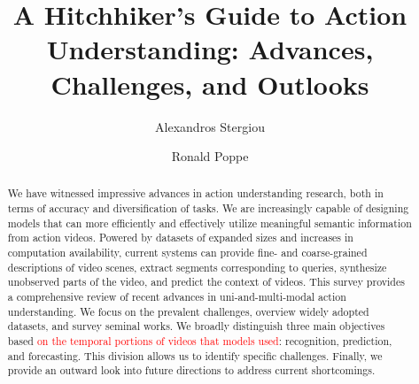 \documentclass[smallextended,twocolumn,natbib]{svjour3}
\begin{document}
\title{A Hitchhiker's Guide to Action Understanding: Advances, Challenges, and Outlooks}



\author{Alexandros Stergiou \and Ronald Poppe}


\maketitle

\begin{abstract}
We have witnessed impressive advances in action understanding research, both in terms of accuracy and diversification of tasks. We are increasingly capable of designing models that can more efficiently and effectively utilize meaningful semantic information from action videos. Powered by datasets of expanded sizes and increases in computation availability, current systems can provide fine- and coarse-grained descriptions of video scenes, extract segments corresponding to queries, synthesize unobserved parts of the video, and predict the context of videos. This survey provides a comprehensive review of recent advances in uni-and-multi-modal action understanding. We focus on the prevalent challenges, overview widely adopted datasets, and survey seminal works. We broadly distinguish three main objectives based \textcolor{red}{on the temporal portions of videos that models used}: recognition, prediction, and forecasting. This division allows us to identify specific challenges. Finally, we provide an outward look into future directions to address current shortcomings.

\end{abstract}
\end{document}
